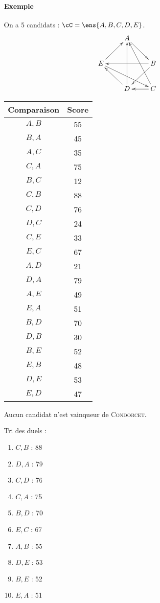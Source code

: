 \documentclass{mybourbaki}
\begin{document}
\paragraph{Exemple}On a 5 candidats : $\cC = \ens{A,B,C,D,E}$.
\[ \xymatrix{
& A\ar[rd] \\
E\ar[ur]\ar[rrd] & & B\ar[ld] \ar[ll]\\
& D \ar[uu]\ar[ul]& C\ar[l]\ar[luu]
}\]
\begin{center}
\begin{tabular}{|c|c|}
\hline 
Comparaison & Score \\ 
\hline 
$A,B$ & 55 \\ 
$B,A$ & 45 \\
\hline
$A,C$ & 35 \\  
$C,A$ & 75 \\
\hline
$B,C$ & 12 \\  
$C,B$ & 88 \\
\hline
$C,D$ & 76 \\  
$D,C$ & 24 \\
\hline
$C,E$ & 33 \\  
$E,C$ & 67 \\
\hline
$A,D$ & 21 \\  
$D,A$ & 79 \\   
\hline
$A,E$ & 49 \\  
$E,A$ & 51 \\
\hline
$B,D$ & 70 \\  
$D,B$ & 30 \\
\hline
$B,E$ & 52 \\  
$E,B$ & 48 \\     
\hline
$D,E$ & 53 \\  
$E,D$ & 47 \\ 
\hline
\end{tabular} 
\end{center}
Aucun candidat n'est vainqueur de \textsc{Condorcet}.

Tri des duels :
\begin{enumerate}
\item $C,B$ : 88
\item $D,A$ : 79
\item $C,D$ : 76
\item $C,A$ : 75
\item $B,D$ : 70
\item $E,C$ : 67
\item $A,B$ : 55
\item $D,E$ : 53 
\item $B,E$ : 52
\item $E,A$ : 51
\end{enumerate}
\end{document}
